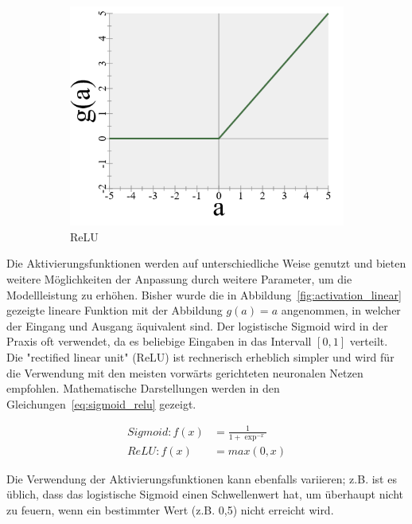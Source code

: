 \begin{figure}
\begin{subfigure}[b]{0.3\textwidth}
        \includegraphics[width=\textwidth]{images/4_relu.png}
        \caption{ReLU}
        \label{fig:activation_relu}
    \end{subfigure}
    \caption{} %
    \label{fig:activation}
\end{figure}

Die Aktivierungsfunktionen werden auf unterschiedliche Weise genutzt und bieten weitere Möglichkeiten der Anpassung durch weitere Parameter, um die Modellleistung zu erhöhen.
Bisher wurde die in Abbildung~\ref{fig:activation_linear} gezeigte lineare Funktion mit der Abbildung $g(a) = a$ angenommen, in welcher der Eingang und Ausgang äquivalent sind.
Der logistische Sigmoid wird in der Praxis oft verwendet, da es beliebige Eingaben in das Intervall $[0,1]$ verteilt.
Die "rectified linear unit" (ReLU) ist rechnerisch erheblich simpler und wird für die Verwendung mit den meisten vorwärts gerichteten neuronalen Netzen \cite[S.169]{Goodfellow2017}\cite{Glorot2011} empfohlen.
Mathematische Darstellungen werden in den Gleichungen~\eqref{eq:sigmoid_relu} gezeigt.

\begin{equation}
    \begin{split}
        Sigmoid: f(x) & = \frac{1}{1 + \exp^{-x}} \\ ReLU: f(x) & = max(0, x)
    \end{split}
    \label{eq:sigmoid_relu}
\end{equation}

Die Verwendung der Aktivierungsfunktionen kann ebenfalls variieren; z.B. ist es üblich, dass das logistische Sigmoid einen Schwellenwert hat, um überhaupt nicht zu feuern, wenn ein bestimmter Wert (z.B. 0,5) nicht erreicht wird.

